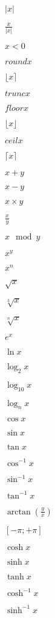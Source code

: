 \documentclass{article}
\begin{document}
$ {|x|} $
\pagebreak

$ {\frac{x}{|x|}} $
\pagebreak

$ {x < 0} $
\pagebreak

$ {round{x}} $
\pagebreak

$ {\lfloor{x}\rceil} $
\pagebreak

$ {trunc{x}} $
\pagebreak

$ {floor{x}} $
\pagebreak

$ {\lfloor{x}\rfloor} $
\pagebreak

$ {ceil{x}} $
\pagebreak

$ {\lceil{x}\rceil} $
\pagebreak

$ {x + y} $
\pagebreak

$ {x - y} $
\pagebreak

$ {x \times y} $
\pagebreak

$ {\frac{x}{y}} $
\pagebreak

$ {x \mod y} $
\pagebreak

$ {x^y} $
\pagebreak

$ {x^n} $
\pagebreak

$ {\sqrt{x}} $
\pagebreak

$ {\sqrt[3]{x}} $
\pagebreak

$ {\sqrt[n]{x}} $
\pagebreak

$ {e^x} $
\pagebreak

$ {\ln {x}} $
\pagebreak

$ {\log_{2} {x}} $
\pagebreak

$ {\log_{10} {x}} $
\pagebreak

$ {\log_{n} {x}} $
\pagebreak

$ {\cos {x}} $
\pagebreak

$ {\sin {x}} $
\pagebreak

$ {\tan {x}} $
\pagebreak

$ {\cos^{-1} {x}} $
\pagebreak

$ {\sin^{-1} {x}} $
\pagebreak

$ {\tan^{-1} {x}} $
\pagebreak

$ {\arctan(\frac{y}{x})} $
\pagebreak

$ {[-\pi;+\pi]} $
\pagebreak

$ {\cosh {x}} $
\pagebreak

$ {\sinh {x}} $
\pagebreak

$ {\tanh {x}} $
\pagebreak

$ {\cosh^{-1} {x}} $
\pagebreak

$ {\sinh^{-1} {x}} $
\pagebreak
\end{document}

